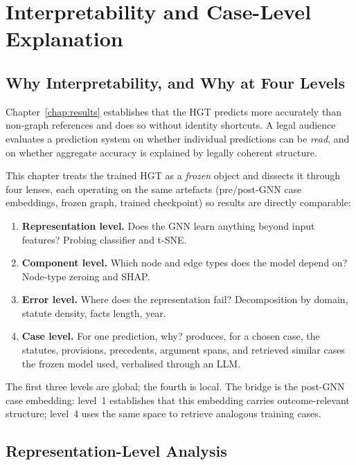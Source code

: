 \chapter{Interpretability and Case-Level Explanation}
\label{chap:explainability}

\section{Why Interpretability, and Why at Four Levels}

Chapter~\ref{chap:results} establishes that the HGT predicts more accurately than non-graph references and does so without identity shortcuts. A legal audience evaluates a prediction system on whether individual predictions can be \emph{read}, and on whether aggregate accuracy is explained by legally coherent structure.

This chapter treats the trained HGT as a \emph{frozen} object and dissects it through four lenses, each operating on the same artefacts (pre/post-GNN case embeddings, frozen graph, trained checkpoint) so results are directly comparable:

\begin{enumerate}
  \item \textbf{Representation level.} Does the GNN learn anything beyond input features? Probing classifier and t-SNE.
  \item \textbf{Component level.} Which node and edge types does the model depend on? Node-type zeroing and SHAP.
  \item \textbf{Error level.} Where does the representation fail? Decomposition by domain, statute density, facts length, year.
  \item \textbf{Case level.} For one prediction, why?  produces, for a chosen case, the statutes, provisions, precedents, argument spans, and retrieved similar cases the frozen model used, verbalised through an LLM.
\end{enumerate}

The first three levels are global; the fourth is local. The bridge is the post-GNN case embedding: level~1 establishes that this embedding carries outcome-relevant structure; level~4 uses the same space to retrieve analogous training cases.

\section{Representation-Level Analysis}
\label{sec:repr_analysis}

